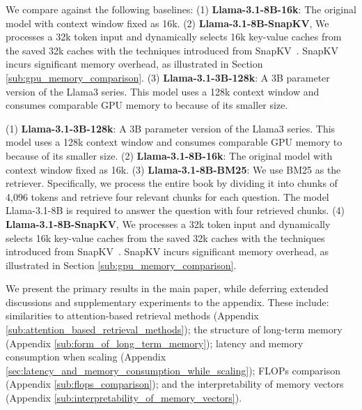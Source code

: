 We compare \ours against the following baselines: (1) \textbf{Llama-3.1-8B-16k}: The original model with context window fixed as 16k. (2) \textbf{Llama-3.1-8B-SnapKV}, We processes a 32k token input and dynamically selects 16k key-value caches from the saved 32k caches with the techniques introduced from SnapKV~\citep{snapkv}. SnapKV incurs significant memory overhead, as illustrated in Section \ref{sub:gpu_memory_comparison}. (3) \textbf{Llama-3.1-3B-128k}: A 3B parameter version of the Llama3 series. This model uses a 128k context window and consumes comparable GPU memory to \ours because of its smaller size.

(1) \textbf{Llama-3.1-3B-128k}: A 3B parameter version of the Llama3 series. This model uses a 128k context window and consumes comparable GPU memory to \ours because of its smaller size. (2) \textbf{Llama-3.1-8B-16k}: The original model with context window fixed as 16k. (3) \textbf{Llama-3.1-8B-BM25}:
We use BM25 as the retriever. Specifically, we process the entire book by dividing it into chunks of 4,096 tokens and retrieve four relevant chunks for each question. The model Llama-3.1-8B is required to answer the question with four retrieved chunks. (4) \textbf{Llama-3.1-8B-SnapKV}, We processes a 32k token input and dynamically selects 16k key-value caches from the saved 32k caches with the techniques introduced from SnapKV~\citep{snapkv}. SnapKV incurs significant memory overhead, as illustrated in Section \ref{sub:gpu_memory_comparison}. 

We present the primary results in the main paper, while deferring extended discussions and supplementary experiments to the appendix. These include: similarities to attention-based retrieval methods (Appendix \ref{sub:attention_based_retrieval_methods}); the structure of long-term memory (Appendix \ref{sub:form_of_long_term_memory}); latency and memory consumption when scaling (Appendix \ref{sec:latency_and_memory_consumption_while_scaling}); FLOPs comparison (Appendix \ref{sub:flops_comparison}); and the interpretability of memory vectors (Appendix \ref{sub:interpretability_of_memory_vectors}).


